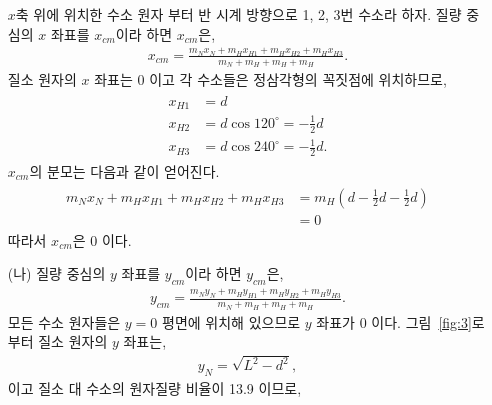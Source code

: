 \documentclass[floatfix,nofootinbib,superscriptaddress,fleqn]{revtex4-2}
\begin{document}
\begin{itemize}
  $x$축 위에 위치한 수소 원자 부터 반 시계 방향으로 1, 2, 3번 수소라 
  하자. 질량 중심의 $x$ 좌표를 $x_{cm}$이라 하면 $x_{cm}$은,
  \begin{align}
    x_{cm} = \frac{m_{N}x_{N} + m_{H}x_{H1} + m_{H}x_{H2} + m_{H}x_{H3}}
    {m_{N} + m_{H} + m_{H} + m_{H}}.
  \end{align}
  질소 원자의 $x$ 좌표는 0 이고 각 수소들은 정삼각형의 꼭짓점에 위치하므로,
  \begin{align}
    \begin{split}
      x_{H1} &= d  \\
      x_{H2} &= d\cos{120^\circ} =-\frac{1}{2}d \\
      x_{H3} &= d\cos{240^\circ} =-\frac{1}{2}d .
    \end{split}
  \end{align}
  $x_{cm}$의 분모는 다음과 같이 얻어진다.
  \begin{align}
    \begin{split}
      m_{N}x_{N} + m_{H}x_{H1} + m_{H}x_{H2} + m_{H}x_{H3}
      &=m_{H}\left(d -\frac{1}{2}d -\frac{1}{2}d\right) \\
      &=0
    \end{split}
  \end{align}
  따라서 $x_{cm}$은 0 이다.
  \item[(나)] 질량 중심의 $y$ 좌표를 $y_{cm}$이라 하면 $y_{cm}$은,
  \begin{align}
    y_{cm} = \frac{m_{N}y_{N} + m_{H}y_{H1} + m_{H}y_{H2} + m_{H}y_{H3}}
    {m_{N} + m_{H} + m_{H} + m_{H}}.
  \end{align}
  모든 수소 원자들은 $y=0$ 평면에 위치해 있으므로 $y$ 좌표가 0 이다. 
  그림~\ref{fig:3}로 부터 질소 원자의 $y$ 좌표는,
  \begin{align}
    y_{N} = \sqrt{L^2-d^2},
  \end{align}
  이고 질소 대 수소의 원자질량 비율이 13.9 이므로,

\end{itemize}
\end{document}
